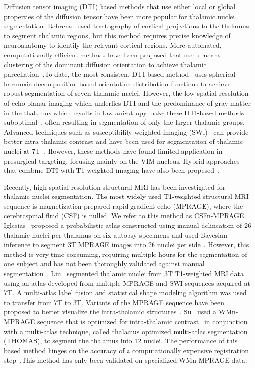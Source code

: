 Diffusion tensor imaging (DTI) based methods that use either local or global properties of the diffusion tensor have been more popular for thalamic nuclei segmentation. Behrens~\cite{1921968:27964322} used tractography of cortical projections to the thalamus to segment thalamic regions, but this method requires precise knowledge of neuroanatomy to identify the relevant cortical regions. More automated, computationally efficient methods have been proposed that use k-means clustering of the dominant diffusion orientation to achieve thalamic parcellation~\cite{1921968:27964358,1921968:27964373,1921968:27964376}.To date, the most consistent DTI-based method~\cite{1921968:27964342} uses spherical harmonic decomposition based orientation distribution functions to achieve robust segmentation of seven thalamic nuclei. However, the low spatial resolution of echo-planar imaging which underlies DTI and the predominance of gray matter in the thalamus which results in low anisotropy make these DTI-based methods suboptimal~\cite{1921968:27964332}, often resulting in segmentation of only the larger thalamic groups. Advanced techniques such as susceptibility-weighted imaging (SWI)~\cite{1921968:27964313} can provide better intra-thalamic contrast and have been used for segmentation of thalamic nuclei at 7T~\cite{1921968:27964334,1921968:27964324}. However, these methods have found limited application in presurgical targeting, focusing mainly on the VIM nucleus. Hybrid approaches that combine DTI with T1 weighted imaging have also been proposed~\cite{1921968:27964316,1921968:27964360}.

Recently, high spatial resolution structural MRI has been investigated for thalamic nuclei segmentation. The most widely used T1-weighted structural MRI sequence is magnetization prepared rapid gradient echo (MPRAGE), where the cerebrospinal fluid (CSF) is nulled. We refer to this method as CSFn-MPRAGE\@. Iglesias~\cite{1921968:27964310} proposed a probabilistic atlas constructed using manual delineation of 26 thalamic nuclei per thalamus on six autopsy specimens and used Bayesian inference to segment 3T MPRAGE images into 26 nuclei per side~\cite{1921968:27964346,1921968:27964327}. However, this method is very time consuming, requiring multiple hours for the segmentation of one subject and has not been thoroughly validated against manual segmentation~\cite{1921968:27964310}. Liu~\cite{1921968:27964316,1921968:27964340} segmented thalamic nuclei from 3T T1-weighted MRI data using an atlas developed from multiple MPRAGE and SWI sequences acquired at 7T. A multi-atlas label fusion and statistical shape modeling algorithm was used to transfer from 7T to 3T. Variants of the MPRAGE sequence have been proposed to better visualize the intra-thalamic structures~\cite{1921968:27964370,1921968:27964323}. Su~\cite{1921968:27964332} used a WMn-MPRAGE sequence that is optimized for intra-thalamic contrast~\cite{1921968:27964351} in conjunction with a multi-atlas technique, called thalamus optimized multi-atlas segmentation (THOMAS), to segment the thalamus into 12 nuclei. The performance of this based method hinges on the accuracy of a computationally expensive registration step~\cite{1921968:27964310,1921968:27964359}.This method has only been validated on specialized WMn-MPRAGE data.

